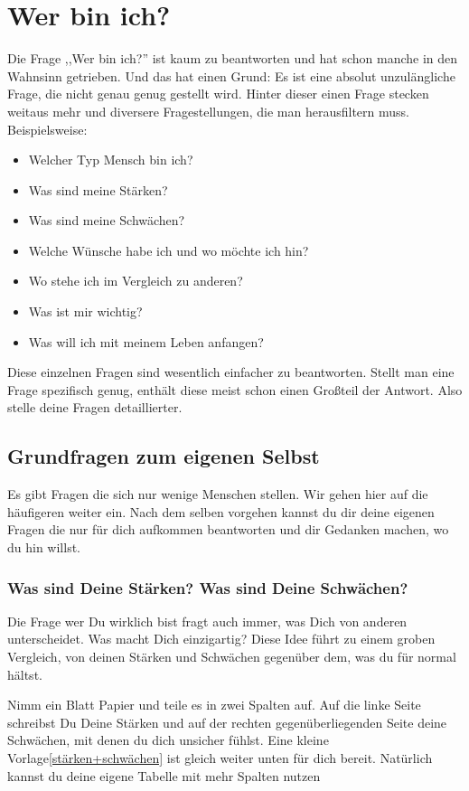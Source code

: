 \documentclass[../Lebensziel.tex]{subfiles}
\begin{document}
\chapter{Wer bin ich?}\thispagestyle{fancy}
Die Frage ,,Wer bin ich?'' ist kaum zu beantworten und hat schon manche in den Wahnsinn getrieben. Und das hat einen Grund: Es ist eine absolut unzulängliche Frage, die nicht genau genug gestellt wird. Hinter dieser einen Frage stecken weitaus mehr und diversere Fragestellungen, die man herausfiltern muss. Beispielsweise:
\begin{itemize}
    \item Welcher Typ Mensch bin ich?
    \item Was sind meine Stärken?
    \item Was sind meine Schwächen?
    \item Welche Wünsche habe ich und wo möchte ich hin?
    \item Wo stehe ich im Vergleich zu anderen?
    \item Was ist mir wichtig?
    \item Was will ich mit meinem Leben anfangen?
\end{itemize}
Diese einzelnen Fragen sind wesentlich einfacher zu beantworten.
Stellt man eine Frage spezifisch genug, enthält diese meist schon einen Großteil der Antwort.
Also stelle deine Fragen detaillierter.

\newpage
\section{Grundfragen zum eigenen Selbst}
Es gibt Fragen die sich nur wenige Menschen stellen. Wir gehen hier auf die häufigeren weiter ein. Nach dem selben vorgehen kannst du dir deine eigenen Fragen die nur für dich aufkommen beantworten und dir Gedanken machen, wo du hin willst.

\subsection*{Was sind Deine Stärken? Was sind Deine Schwächen?}
Die Frage wer Du wirklich bist fragt auch immer, was Dich von anderen unterscheidet. Was macht Dich einzigartig? Diese Idee führt zu einem groben Vergleich, von deinen Stärken und Schwächen gegenüber dem, was du für normal hältst.

Nimm ein Blatt Papier und teile es in zwei Spalten auf. Auf die linke Seite schreibst Du Deine Stärken und auf der rechten gegenüberliegenden Seite deine Schwächen, mit denen du dich unsicher fühlst. Eine kleine Vorlage\ref{stärken+schwächen} ist gleich weiter unten für dich bereit. Natürlich kannst du deine eigene Tabelle mit mehr Spalten nutzen
\end{document}
